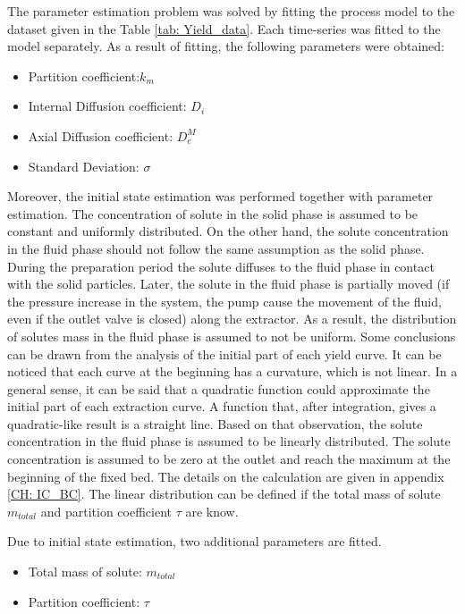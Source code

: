 \documentclass[../Article_Model_Parameters.tex]{subfiles}
\begin{document}
	
	\label{CH: Results}

    The parameter estimation problem was solved by fitting the process model to the dataset given in the Table \ref{tab: Yield_data}. Each time-series was fitted to the model separately. As a result of fitting, the following parameters were obtained:

    \begin{itemize}
        \item Partition coefficient:\qquad\quad\qquad$k_m$
        \item Internal Diffusion coefficient: \quad$D_i$
        \item Axial Diffusion coefficient: \qquad$D_e^M$
        \item Standard Deviation: \qquad\qquad\quad$\sigma$
    \end{itemize}

    Moreover, the initial state estimation was performed together with parameter estimation. The concentration of solute in the solid phase is assumed to be constant and uniformly distributed. On the other hand, the solute concentration in the fluid phase should not follow the same assumption as the solid phase. During the preparation period the solute diffuses to the fluid phase in contact with the solid particles. Later, the solute in the fluid phase is partially moved (if the pressure increase in the system, the pump cause the movement of the fluid, even if the outlet valve is closed) along the extractor. As a result, the distribution of solutes mass in the fluid phase is assumed to not be uniform. Some conclusions can be drawn from the analysis of the initial part of each yield curve. It can be noticed that each curve at the beginning has a curvature, which is not linear. In a general sense, it can be said that a quadratic function could approximate the initial part of each extraction curve. A function that, after integration, gives a quadratic-like result is a straight line. Based on that observation, the solute concentration in the fluid phase is assumed to be linearly distributed. The solute concentration is assumed to be zero at the outlet and reach the maximum at the beginning of the fixed bed. The details on the calculation are given in appendix \ref{CH: IC_BC}. The linear distribution can be defined if the total mass of solute $m_{total}$ and partition coefficient $\tau$ are know.
    
    Due to initial state estimation, two additional parameters are fitted.

    \begin{itemize}
        \item Total mass of solute: \qquad\qquad\quad$m_{total}$
        \item Partition coefficient: \qquad\qquad\quad$\tau$
    \end{itemize}
\end{document}
